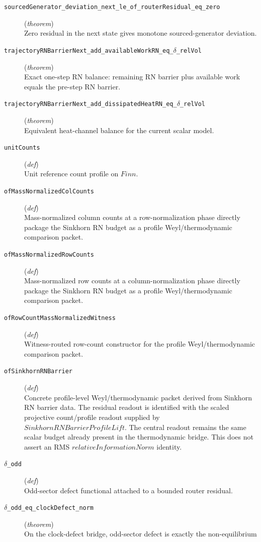 \documentclass[11pt,a4paper]{article}
\begin{document}
\begin{description}
  \item[\texttt{sourcedGenerator\_deviation\_next\_le\_of\_routerResidual\_eq\_zero}] (\textit{theorem}) \\ Zero residual in the next state gives monotone sourced-generator deviation.
  \item[\texttt{trajectoryRNBarrierNext\_add\_availableWorkRN\_eq\_$\delta $\_relVol}] (\textit{theorem}) \\ Exact one-step RN balance: remaining RN barrier plus available work equals the 
pre-step RN barrier.
  \item[\texttt{trajectoryRNBarrierNext\_add\_dissipatedHeatRN\_eq\_$\delta $\_relVol}] (\textit{theorem}) \\ Equivalent heat-channel balance for the current scalar model.
  \item[\texttt{unitCounts}] (\textit{def}) \\ Unit reference count profile on $Fin n$.
  \item[\texttt{ofMassNormalizedColCounts}] (\textit{def}) \\ Mass-normalized column counts at a row-normalization phase directly package the 
Sinkhorn RN budget as a profile Weyl/thermodynamic comparison packet.
  \item[\texttt{ofMassNormalizedRowCounts}] (\textit{def}) \\ Mass-normalized row counts at a column-normalization phase directly package the 
Sinkhorn RN budget as a profile Weyl/thermodynamic comparison packet.
  \item[\texttt{ofRowCountMassNormalizedWitness}] (\textit{def}) \\ Witness-routed row-count constructor for the profile Weyl/thermodynamic 
comparison packet.
  \item[\texttt{ofSinkhornRNBarrier}] (\textit{def}) \\ Concrete profile-level Weyl/thermodynamic packet derived from Sinkhorn RN 
barrier data. 
The residual readout is identified with the scaled projective count/profile 
readout supplied by $SinkhornRNBarrierProfileLift$. The central readout remains 
the same scalar budget already present in the thermodynamic bridge. This does 
not assert an RMS $relativeInformationNorm$ identity.
  \item[\texttt{$\delta $\_odd}] (\textit{def}) \\ Odd-sector defect functional attached to a bounded router residual.
  \item[\texttt{$\delta $\_odd\_eq\_clockDefect\_norm}] (\textit{theorem}) \\ On the clock-defect bridge, odd-sector defect is exactly the non-equilibrium 

\end{description}
\end{document}
